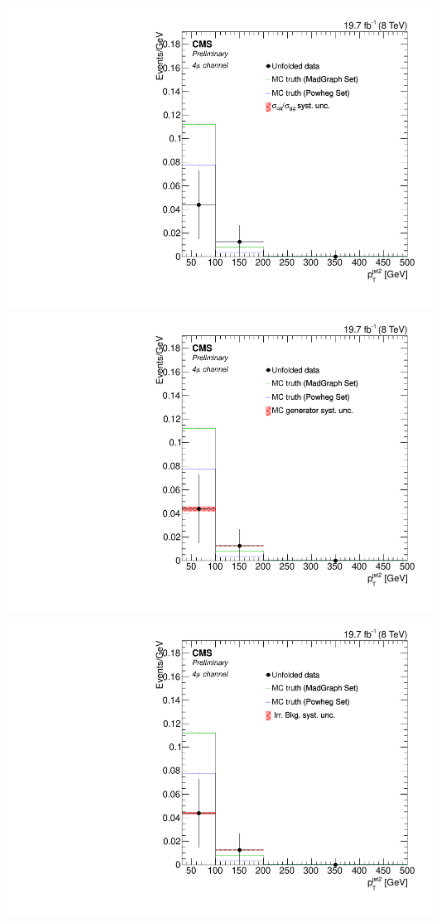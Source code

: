 \begin{figure}[hbtp]
 \begin{center}
   \includegraphics[width=0.8\cmsFigWidth]{Figures/Unfolding/Systematics/ZZTo4m_PtJet2_qqgg_Mad_fr}     
   \includegraphics[width=0.8\cmsFigWidth]{Figures/Unfolding/Systematics/ZZTo4m_PtJet2_MCgen_Mad_fr}     
   \includegraphics[width=0.8\cmsFigWidth]{Figures/Unfolding/Systematics/ZZTo4m_PtJet2_IrrBkg_Mad_fr}

\end{center}
\end{figure}
